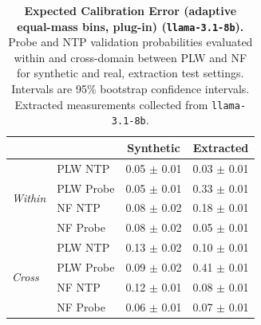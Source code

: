 \begin{table}[ht]
\centering
\begin{tabular}{ll cc}
\toprule
& & Synthetic & Extracted \\
\midrule
\multirow{4}{*}{\textit{Within}}
& PLW NTP & 0.05 $\pm$ 0.01 & 0.03 $\pm$ 0.01 \\
& PLW Probe & 0.05 $\pm$ 0.01 & 0.33 $\pm$ 0.01 \\
& NF NTP & 0.08 $\pm$ 0.02 & 0.18 $\pm$ 0.01 \\
& NF Probe & 0.08 $\pm$ 0.02 & 0.05 $\pm$ 0.01 \\
\midrule
\multirow{4}{*}{\textit{Cross}}
& PLW NTP & 0.13 $\pm$ 0.02 & 0.10 $\pm$ 0.01 \\
& PLW Probe & 0.09 $\pm$ 0.02 & 0.41 $\pm$ 0.01 \\
& NF NTP & 0.12 $\pm$ 0.01 & 0.08 $\pm$ 0.01 \\
& NF Probe & 0.06 $\pm$ 0.01 & 0.07 $\pm$ 0.01 \\
\bottomrule
\end{tabular}
\caption{\textbf{Expected Calibration Error (adaptive equal-mass bins, plug-in) (\texttt{llama-3.1-8b}).} Probe and NTP validation probabilities evaluated within and cross-domain between PLW and NF for synthetic and real, extraction test settings. Intervals are 95\% bootstrap confidence intervals. Extracted measurements collected from \texttt{llama-3.1-8b}.}
\label{tab:llama-3.1-8b-llama-3.1-8b-pond_nfix-ece_em}
\end{table}
